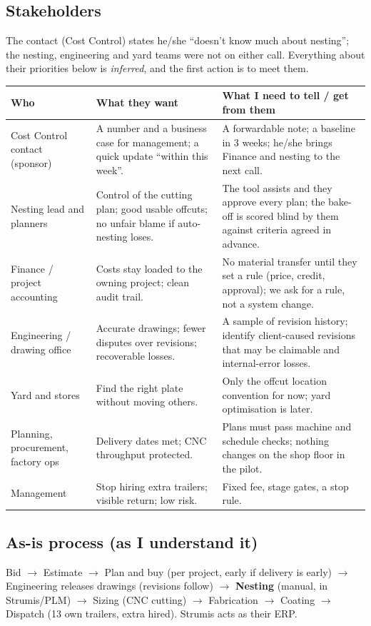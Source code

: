 \documentclass[10pt,a4paper]{article}
\begin{document}
\subsection{Stakeholders}
The contact (Cost Control) states he/she ``doesn't know much about nesting''; the nesting, engineering and yard teams were not on either call. Everything about their priorities below is \emph{inferred}, and the first action is to meet them.

\begin{tabular}{@{}P{3.3cm}P{6.4cm}P{6.3cm}@{}}
\toprule
\textbf{Who} & \textbf{What they want} & \textbf{What I need to tell / get from them} \\
\midrule
Cost Control contact (sponsor) & A number and a business case for management; a quick update ``within this week''. & A forwardable note; a baseline in 3 weeks; he/she brings Finance and nesting to the next call. \\
Nesting lead and planners & Control of the cutting plan; good usable offcuts; no unfair blame if auto-nesting loses. & The tool assists and they approve every plan; the bake-off is scored blind by them against criteria agreed in advance. \\
Finance / project accounting & Costs stay loaded to the owning project; clean audit trail. & No material transfer until they set a rule (price, credit, approval); we ask for a rule, not a system change. \\
Engineering / drawing office & Accurate drawings; fewer disputes over revisions; recoverable losses. & A sample of revision history; identify client-caused revisions that may be claimable and internal-error losses. \\
Yard and stores & Find the right plate without moving others. & Only the offcut location convention for now; yard optimisation is later. \\
Planning, procurement, factory ops & Delivery dates met; CNC throughput protected. & Plans must pass machine and schedule checks; nothing changes on the shop floor in the pilot. \\
Management & Stop hiring extra trailers; visible return; low risk. & Fixed fee, stage gates, a stop rule. \\
\bottomrule
\end{tabular}

\subsection{As-is process (as I understand it)}
\small
Bid $\to$ Estimate $\to$ Plan and buy (per project, early if delivery is early) $\to$ Engineering releases drawings (revisions follow) $\to$ \textbf{Nesting} (manual, in Strumis/PLM) $\to$ Sizing (CNC cutting) $\to$ Fabrication $\to$ Coating $\to$ Dispatch (13 own trailers, extra hired). Strumis acts as their ERP.
\normalsize
\end{document}
